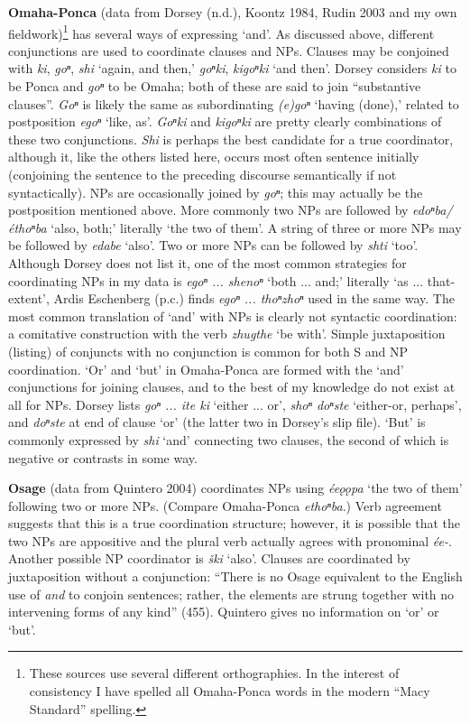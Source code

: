 \documentclass[output=paper]{LSP/langsci}
\begin{document}
\textbf{Omaha-Ponca} (data from Dorsey (n.d.), Koontz 1984, Rudin 2003 and my own fieldwork)\footnote{These sources use several different orthographies. In the interest of consistency I have spelled all Omaha-Ponca words in the modern ``Macy Standard'' spelling.} has several ways of expressing `and'. As discussed above, different conjunctions are used to coordinate clauses and NPs. Clauses may be conjoined with \textit{ki}, \textit{goⁿ}, \textit{shi} `again, and then,' \textit{goⁿki}, \textit{kigoⁿki} `and then'. Dorsey considers \textit{ki} to be Ponca and \textit{goⁿ} to be Omaha; both of these are said to join ``substantive clauses''. \textit{Goⁿ} is likely the same as subordinating \textit{(e)goⁿ} `having (done),' related to postposition \textit{egoⁿ} `like, as'. \textit{Goⁿki} and \textit{kigoⁿki} are pretty clearly combinations of these two conjunctions. \textit{Shi} is perhaps the best candidate for a true coordinator, although it, like the others listed here, occurs most often sentence initially (conjoining the sentence to the preceding discourse semantically if not syntactically). NPs are occasionally joined by \textit{goⁿ}; this may actually be the postposition mentioned above. More commonly two NPs are followed by \textit{edoⁿba/\'ethoⁿba} `also, both;' literally `the two of them'. A string of three or more NPs may be followed by \textit{edabe} `also'. Two or more NPs can be followed by \textit{shti} `too'. Although Dorsey does not list it, one of the most common strategies for coordinating NPs in my data is \textit{egoⁿ ... shenoⁿ} `both ... and;' literally `as ... that-extent', Ardis Eschenberg (p.c.) finds \textit{egoⁿ ... thoⁿzhoⁿ} used in the same way. The most common translation of `and' with NPs is clearly not syntactic coordination: a comitative construction with the verb \textit{zhugthe} `be with'. Simple juxtaposition (listing) of conjuncts with no conjunction is common for both S and NP coordination. `Or' and `but' in Omaha-Ponca are formed with the `and' conjunctions for joining clauses, and to the best of my knowledge do not exist at all for NPs. Dorsey lists \textit{goⁿ ... ite ki} `either ... or', \textit{shoⁿ doⁿste} `either-or, perhaps', and \textit{doⁿste} at end of clause `or' (the latter two in Dorsey's slip file). `But' is commonly expressed by \textit{shi} `and' connecting two clauses, the second of which is negative or contrasts in some way.

\textbf{Osage} (data from Quintero 2004) coordinates NPs using \textit{\'ee\k{o}\k{o}pa} `the two of them' following two or more NPs. (Compare Omaha-Ponca \textit{ethoⁿba}.) Verb agreement suggests that this is a true coordination structure; however, it is possible that the two NPs are appositive and the plural verb actually agrees with pronominal \textit{\'ee-}. Another possible NP coordinator is \textit{\v{s}ki} `also'. Clauses are coordinated by juxtaposition without a conjunction: ``There is no Osage equivalent to the English use of \textit{and} to conjoin sentences; rather, the elements are strung together with no intervening forms of any kind'' (455). Quintero gives no information on `or' or `but'.
\end{document}
